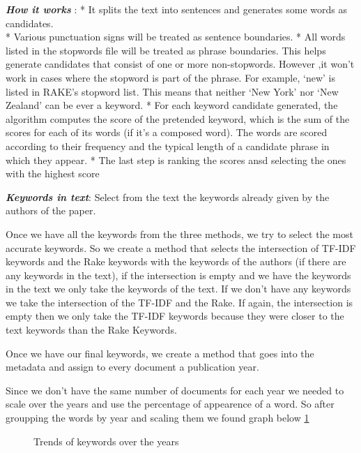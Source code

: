 \documentclass[journal,twocolumn]{IEEEtran}
\begin{document}
\textbf{\emph{How it works}} : * It splits the text into sentences and
generates some words as candidates.\\
* Various punctuation signs will be treated as sentence boundaries. *
All words listed in the stopwords file will be treated as phrase
boundaries. This helps generate candidates that consist of one or more
non-stopwords. However ,it won't work in cases where the stopword is
part of the phrase. For example, `new' is listed in RAKE's stopword
list. This means that neither `New York' nor `New Zealand' can be ever a
keyword. * For each keyword candidate generated, the algorithm computes
the score of the pretended keyword, which is the sum of the scores for
each of its words (if it's a composed word). The words are scored
according to their frequency and the typical length of a candidate
phrase in which they appear. * The last step is ranking the scores ansd
selecting the ones with the highest score

    \textbf{\emph{Keywords in text}}: Select from the text the keywords
already given by the authors of the paper.

    Once we have all the keywords from the three methods, we try to select
the most accurate keywords. So we create a method that selects the
intersection of TF-IDF keywords and the Rake keywords with the keywords
of the authors (if there are any keywords in the text), if the
intersection is empty and we have the keywords in the text we only take
the keywords of the text. If we don't have any keywords we take the
intersection of the TF-IDF and the Rake. If again, the intersection is
empty then we only take the TF-IDF keywords because they were closer to
the text keywords than the Rake Keywords.

    Once we have our final keywords, we create a method that goes into the
metadata and assign to every document a publication year.


    Since we don't have the same number of documents for each year we needed
to scale over the years and use the percentage of appearence of a word.
So after groupping the words by year and scaling them we found graph
below \ref{fig1}


    \begin{figure}
        \begin{center}\end{center}
        \caption{Trends of keywords over the years}
        \label{fig1}
    \end{figure}
    
\end{document}
